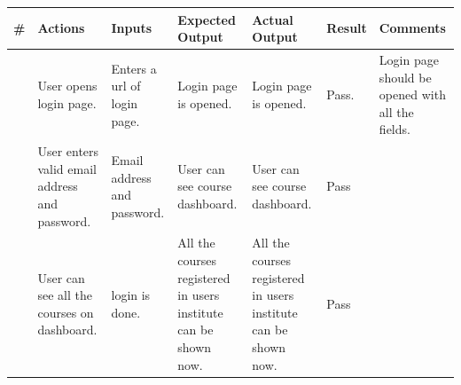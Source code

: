\documentclass[12pt]{article}
\begin{document}
\begin{longtable}{ |>{\raggedright\arraybackslash} p{0.7cm} | >{\raggedright\arraybackslash}p{2cm}|>{\raggedright\arraybackslash} p{2cm} |>{\raggedright\arraybackslash} p{2.5cm} |>{\raggedright\arraybackslash} p{2.5cm} |>{\raggedright\arraybackslash} p{1.3cm} |>{\raggedright\arraybackslash} p{2.5cm} | } 
\hline
\textbf{\#}
& \textbf{Actions} 
& \textbf{Inputs}
& \textbf{Expected Output} 
& \textbf{Actual Output} 
& \textbf{Result} 
& \textbf{Comments} 
\\ 
\hline
1
& User opens login page. 
& Enters a url of login page.
& Login page is opened.
& Login page is opened.
& Pass.
& Login page should be opened with all the fields.
\\ 
\hline
2 
& User enters valid email address and password.
& Email address and password.
& User can see course dashboard.
& User can see course dashboard. 
& Pass
&  
\\ 
\hline
3
& User can see all the courses on dashboard.
& login is done.
& All the courses registered in users institute can be shown now.
& All the courses registered in users institute can be shown now. 
& Pass
&  
\\ 
\hline
\end{longtable}
\end{document}
